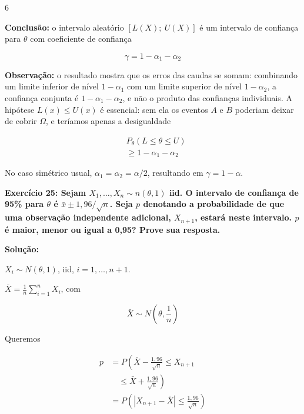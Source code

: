 \documentclass[8pt, a4paper, landscape]{extarticle}
\begin{document}
\begin{multicols}{6}
\vspace{0.2cm}

\textbf{Conclusão:} o intervalo aleatório $[L(X);\ U(X)]$ é um intervalo de confiança para $\theta$ com coeficiente de confiança

\begin{equation*}
\gamma = 1 - \alpha_1 - \alpha_2
\end{equation*}

\textbf{Observação:} o resultado mostra que os erros das caudas se somam: combinando um limite inferior de nível $1-\alpha_1$ com um limite superior de nível $1-\alpha_2$, a confiança conjunta é $1-\alpha_1-\alpha_2$, e não o produto das confianças individuais. A hipótese $L(x) \leq U(x)$ é essencial: sem ela os eventos $A$ e $B$ poderiam deixar de cobrir $\Omega$, e teríamos apenas a desigualdade

\begin{equation*}
\begin{split}
&P_\theta(L \leq \theta \leq U) \\
&\geq 1 - \alpha_1 - \alpha_2
\end{split}
\end{equation*}

No caso simétrico usual, $\alpha_1 = \alpha_2 = \alpha/2$, resultando em $\gamma = 1 - \alpha$.

\textbf{Exercício 25: Sejam $X_1,\dots,X_n \sim n(\theta,1)$ iid. O intervalo de confiança de 95\% para $\theta$ é $\bar{x} \pm 1,96/\sqrt{n}$. Seja $p$ denotando a probabilidade de que uma observação independente adicional, $X_{n+1}$, estará neste intervalo. $p$ é maior, menor ou igual a 0,95? Prove sua resposta.}

\vspace{0.3cm}

\textbf{Solução:}

$X_i \sim N(\theta, 1)$, iid, $i = 1,\dots,n+1$.

$\bar{X} = \frac{1}{n}\sum_{i=1}^{n} X_i$, com

\begin{equation*}
\bar{X} \sim N\left(\theta, \frac{1}{n}\right)
\end{equation*}

Queremos

\begin{equation*}
\begin{split}
p &= P\left(\bar{X} - \frac{1,96}{\sqrt{n}} \leq X_{n+1} \right. \\
&\quad \left. \leq \bar{X} + \frac{1,96}{\sqrt{n}}\right) \\
&= P\left(|X_{n+1} - \bar{X}| \leq \frac{1,96}{\sqrt{n}}\right)
\end{split}
\end{equation*}


\end{multicols}
\end{document}
